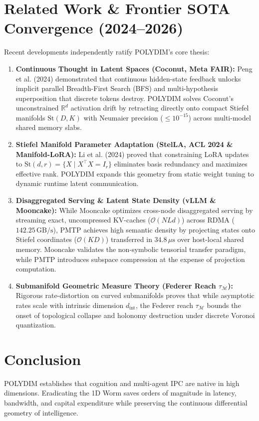 \documentclass[11pt,a4paper]{article}
\begin{document}
\section{Related Work \& Frontier SOTA Convergence (2024--2026)}
\label{sec:related_work}
Recent developments independently ratify POLYDIM's core thesis:
\begin{enumerate}
    \item \textbf{Continuous Thought in Latent Spaces (Coconut, Meta FAIR):} Peng et al. (2024) demonstrated that continuous hidden-state feedback unlocks implicit parallel Breadth-First Search (BFS) and multi-hypothesis superposition that discrete tokens destroy. POLYDIM solves Coconut's unconstrained $\mathbb{R}^d$ activation drift by retracting directly onto compact Stiefel manifolds $\mathrm{St}(D, K)$ with Neumaier precision ($\le 10^{-15}$) across multi-model shared memory slabs.
    \item \textbf{Stiefel Manifold Parameter Adaptation (StelLA, ACL 2024 \& Manifold-LoRA):} Li et al. (2024) proved that constraining LoRA updates to $\mathrm{St}(d, r) = \{X \mid X^\top X = I_r\}$ eliminates basis redundancy and maximizes effective rank. POLYDIM expands this geometry from static weight tuning to dynamic runtime latent communication.
    \item \textbf{Disaggregated Serving \& Latent State Density (vLLM \& Mooncake):} While Mooncake optimizes cross-node disaggregated serving by streaming exact, uncompressed KV-caches ($\mathcal{O}(N L d)$) across RDMA ($142.25\,\text{GB/s}$), PMTP achieves high semantic density by projecting states onto Stiefel coordinates ($\mathcal{O}(K D)$) transferred in $34.8\,\mu\text{s}$ over host-local shared memory. Mooncake validates the non-symbolic tensorial transfer paradigm, while PMTP introduces subspace compression at the expense of projection computation.
    \item \textbf{Submanifold Geometric Measure Theory (Federer Reach $\tau_{\mathcal{M}}$):} Rigorous rate-distortion on curved submanifolds proves that while asymptotic rates scale with intrinsic dimension $d_{\text{int}}$, the Federer reach $\tau_{\mathcal{M}}$ bounds the onset of topological collapse and holonomy destruction under discrete Voronoi quantization.
\end{enumerate}

\section{Conclusion}
\label{sec:conclusion}
POLYDIM establishes that cognition and multi-agent IPC are native in high dimensions. Eradicating the 1D Worm saves orders of magnitude in latency, bandwidth, and capital expenditure while preserving the continuous differential geometry of intelligence.
\end{document}
